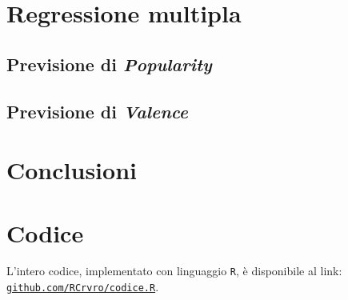 \documentclass[fleqn,10pt]{SelfArx} %
\begin{document}
\section{Regressione multipla}
\subsection{Previsione di \textit{Popularity}}
\subsection{Previsione di \textit{Valence}}
\section{Conclusioni}

\section*{Codice}
L'intero codice, implementato con linguaggio \texttt{R}, è disponibile al link: \href{https://github.com/RCrvro/Foundation-of-Prob.-and-Stat.---Final-Project/blob/master/codice.R}{\texttt{github.com/RCrvro/codice.R}}.
\end{document}
